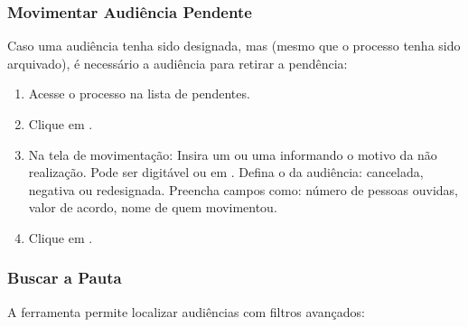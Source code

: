 \documentclass[letterpaper,10pt,brazil]{sphinxmanual}
\begin{document}
\subsubsection{Movimentar Audiência Pendente}
\label{\detokenize{projud_45_listasaudiencias:movimentar-audiencia-pendente}}
\sphinxAtStartPar
Caso uma audiência tenha sido designada, mas  (mesmo que o processo tenha sido arquivado), é necessário  a audiência para retirar a pendência:
\begin{enumerate}
%
\item {} 
\sphinxAtStartPar
Acesse o processo na lista de pendentes.

\item {} 
\sphinxAtStartPar
Clique em .

\item {} 
\sphinxAtStartPar
Na tela de movimentação:
\sphinxhyphen{} Insira um  ou uma  informando o motivo da não realização.
\sphinxhyphen{} Pode ser digitável ou em .
\sphinxhyphen{} Defina o  da audiência: cancelada, negativa ou redesignada.
\sphinxhyphen{} Preencha campos como: número de pessoas ouvidas, valor de acordo, nome de quem movimentou.

\item {} 
\sphinxAtStartPar
Clique em .

\end{enumerate}


\subsubsection{Buscar a Pauta}
\label{\detokenize{projud_45_listasaudiencias:buscar-a-pauta}}
\sphinxAtStartPar
A ferramenta  permite localizar audiências com filtros avançados:

\sphinxAtStartPar
{}
\end{document}
